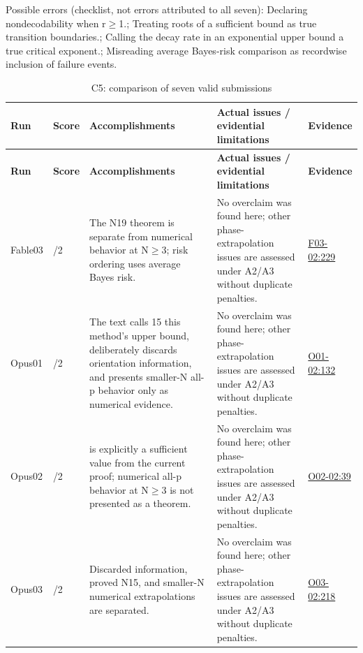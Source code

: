 \documentclass[11pt,a4paper]{article}
\begin{document}
Possible errors (checklist,\allowbreak{} not errors attributed to all seven): Declaring nondecodability when r\ensuremath{\geq}1.; Treating roots of a sufficient bound as true transition boundaries.; Calling the decay rate in an exponential upper bound a true critical exponent.; Misreading average Bayes-risk comparison as recordwise inclusion of failure events.

{\fontsize{9.0}{12.6}\selectfont
\setlength{\tabcolsep}{2.5pt}
\begin{longtable}{>{\raggedright\arraybackslash}p{}>{\raggedright\arraybackslash}p{}>{\raggedright\arraybackslash}p{}>{\raggedright\arraybackslash}p{}>{\raggedright\arraybackslash}p{}}
\caption{C5: comparison of seven valid submissions}\\
\toprule
\textbf{Run} & \textbf{Score} & \textbf{Accomplishments} & \textbf{Actual issues /\allowbreak{} evidential limitations} & \textbf{Evidence}\tabularnewline
\midrule
\endfirsthead
\toprule
\textbf{Run} & \textbf{Score} & \textbf{Accomplishments} & \textbf{Actual issues /\allowbreak{} evidential limitations} & \textbf{Evidence}\tabularnewline
\midrule
\endhead
{}Fable03 & 2/\allowbreak{}2 & The N19 theorem is separate from numerical behavior at N\ensuremath{\geq}3; risk ordering uses average Bayes risk. & No overclaim was found here; other phase-extrapolation issues are assessed under A2/\allowbreak{}A3 without duplicate penalties. & \hyperref[src:F03-02]{F03-02:229}\tabularnewline
{}Opus01 & 2/\allowbreak{}2 & The text calls 15 this method’s upper bound,\allowbreak{} deliberately discards orientation information,\allowbreak{} and presents smaller-N all-p behavior only as numerical evidence. & No overclaim was found here; other phase-extrapolation issues are assessed under A2/\allowbreak{}A3 without duplicate penalties. & \hyperref[src:O01-02]{O01-02:132}\tabularnewline
{}Opus02 & 2/\allowbreak{}2 & 15 is explicitly a sufficient value from the current proof; numerical all-p behavior at N\ensuremath{\geq}3 is not presented as a theorem. & No overclaim was found here; other phase-extrapolation issues are assessed under A2/\allowbreak{}A3 without duplicate penalties. & \hyperref[src:O02-02]{O02-02:39}\tabularnewline
{}Opus03 & 2/\allowbreak{}2 & Discarded information,\allowbreak{} proved N15,\allowbreak{} and smaller-N numerical extrapolations are separated. & No overclaim was found here; other phase-extrapolation issues are assessed under A2/\allowbreak{}A3 without duplicate penalties. & \hyperref[src:O03-02]{O03-02:218}\tabularnewline

\end{longtable}}
\end{document}
